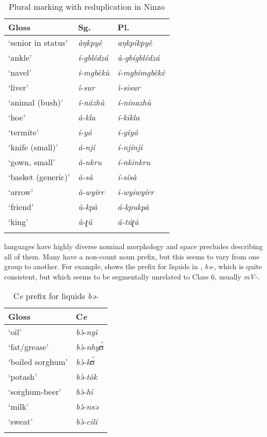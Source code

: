 \documentclass[output=paper]{langsci/langscibook}
\begin{document}
\begin{table}
\caption{Plural marking with reduplication in Ninzo}
\label{extab:nomaffplat:39}
\begin{tabularx}{\textwidth}{XXl}
  \lsptoprule
Gloss 	& {Sg.} 	& {Pl.}\\
\midrule
‘senior in status’ 	&  {\itshape àŋkpyè} &  \textit{aŋkpikpyè} \\
‘ankle’ 	&  \itshape í-gblédzá 	&  \itshape à-gbígblédzá\\
‘navel’ 	&  \itshape í-mgbèkù 	&  \itshape í-mgbímgbèkè\\
‘liver’ 	&  \itshape ì-sur 	&  \itshape ì-sisur\\
‘animal (bush)’ 	&  \itshape í-názhù 	&  \itshape í-nínazhù\\
‘hoe’ 	&  \itshape à-kla 	&  \itshape í-kikla\\
‘termite’ 	&  \itshape í-yó 	&  \itshape í-yíyó\\
‘knife (small)’ 	&  \itshape á-njî 	&  \itshape í-njínjî\\
‘gown, small’ 	&  \itshape à-nkru 	&  \itshape í-nkinkru\\
‘basket (generic)’ 	&  \itshape à-sà 	&  \itshape í-sísà\\
‘arrow’ 	&  \itshape à-wyírr 	&  \itshape i-wyiwyírr\\
‘friend’ 	&  \itshape ù-kpà 	&  \itshape á-kpukpà\\
‘king’ 	&  \itshape ù-ʈû 	&  \itshape á-túʈù\\
\lspbottomrule
 \end{tabularx}
\end{table}


 
 languages have highly diverse nominal morphology and space precludes describing all of them. Many have a non-count noun prefix, but this seems to vary from one group to another. For example,  shows the prefix for liquids in , \textit{bə-}, which is quite consistent, but which seems to be segmentally unrelated to  Class 6, usually \textit{mV-}.

\begin{table}[t]
\caption{C\textit{e} prefix for liquids \textit{bə-}}
\label{extab:nomaffplat:40}
\begin{tabularx}{.66\textwidth}{Xl}
\lsptoprule
Gloss 	&    {C\textit{e}}\\
\midrule
‘oil’ 	&  \textit{bə̀-nyì}\\
‘fat/grease’ 	&  \textit{bə̀-nhyʊ̀}\\
‘boiled sorghum’ 	&  \textit{bə̀-kʊ̀}\\
‘potash’ 	& \itshape   bə̀-tòk	 \\
‘sorghum-beer’ 	&  \textit{bə̀-hi}\\
‘milk’ 	& \itshape  bə̀-nsə\\
‘sweat’ 	&  \textit{bə̀-cilí}\\
\lspbottomrule
\end{tabularx}
\end{table}
\end{document}
